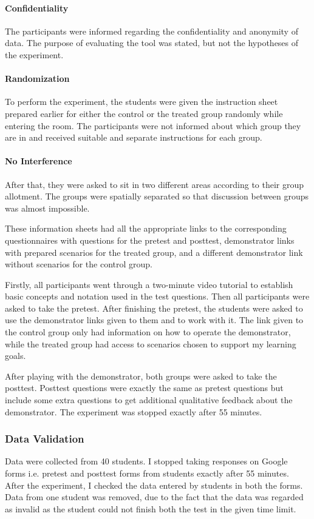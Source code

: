 \paragraph{Confidentiality} The participants were informed regarding the confidentiality and anonymity of data. The purpose of evaluating the tool was stated, but not the hypotheses of the experiment.

\paragraph{Randomization} To perform the experiment, the students were given the instruction sheet prepared earlier for either the control or the treated group randomly while entering the room. The participants were not informed about which group they are in and received suitable and separate instructions for each group.

\paragraph{No Interference} After that, they were asked to sit in two different areas according to their group allotment. The groups were spatially separated so that discussion between groups was almost impossible.

These information sheets had all the appropriate links to the corresponding questionnaires with questions for the pretest and posttest, demonstrator links with prepared scenarios for the treated group, and a different demonstrator link without scenarios for the control group.

Firstly, all participants went through a two-minute video tutorial to establish basic concepts and notation used in the test questions. Then all participants were asked to take the pretest. After finishing the pretest, the students were asked to use the demonstrator links given to them and to work with it. The link given to the control group only had information on how to operate the demonstrator, while the treated group had access to scenarios chosen to support my learning goals. 

After playing with the demonstrator, both groups were asked to take the posttest. Posttest questions were exactly the same as pretest questions but include some extra questions to get additional qualitative feedback about the demonstrator. The experiment was stopped exactly after 55 minutes.

\subsubsection{Data Validation}\label{subsubsec:datavalidation}
Data were collected from 40 students. I stopped taking responses on Google forms i.e. pretest and posttest forms from students exactly after 55 minutes. After the experiment, I checked the data entered by students in both the forms. Data from one student was removed, due to the fact that the data was regarded as invalid as the student could not finish both the test in the given time limit.

